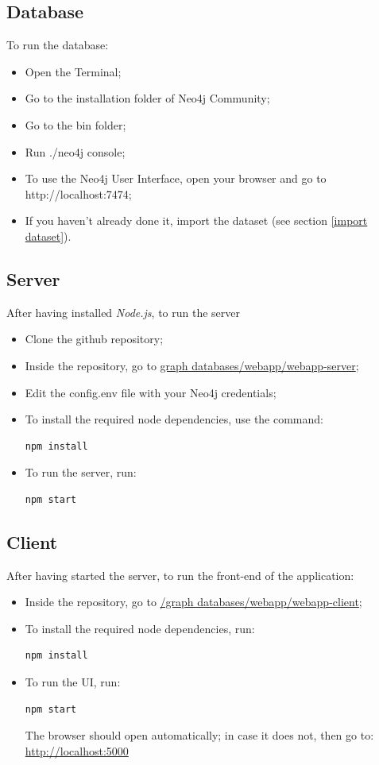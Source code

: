 \documentclass{article}
\begin{document}
\subsection{Database}
To run the database:
\begin{itemize}
    \item Open the Terminal;
    \item Go to the installation folder of Neo4j Community;
    \item Go to the bin folder;
    \item Run ./neo4j console;
    \item To use the Neo4j User Interface, open your browser and go to http://localhost:7474;
    \item If you haven't already done it, import the dataset (see section \ref{import dataset}).
\end{itemize}
\subsection{Server}
After having installed \textit{Node.js}, to run the server
\begin{itemize}
    \item Clone the github repository;
    \item Inside the repository, go to \href{https://github.com/filippolazzati/smbud/tree/main/graph\%20databases/webapp/webapp-server}{graph databases/webapp/webapp-server};
    \item Edit the config.env file with your Neo4j credentials;
    \item To install the required node dependencies, use the command:
    \begin{lstlisting}[language=bash]
    npm install
\end{lstlisting}
\item To run the server, run:
    \begin{lstlisting}[language=bash]
    npm start
\end{lstlisting}
\end{itemize}
\subsection{Client}
After having started the server, to run the front-end of the application:
\begin{itemize}
    \item Inside the repository, go to \href{https://github.com/filippolazzati/smbud/tree/main/graph\%20databases/webapp/webapp-client}{/graph databases/webapp/webapp-client};
    \item To install the required node dependencies, run: 
    \begin{lstlisting}[language=bash]
    npm install
\end{lstlisting}
    \item To run the UI, run:
    \begin{lstlisting}[language=bash]
    npm start
\end{lstlisting} The browser should open automatically; in case it does not, then go to: \url{http://localhost:5000}
\end{itemize}
\end{document}
